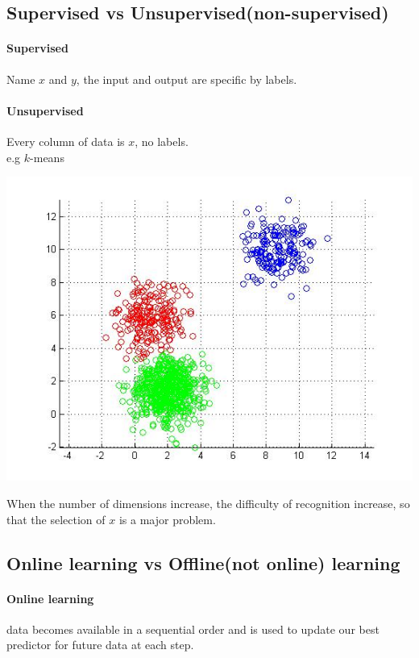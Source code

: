 \documentclass{article}
\begin{document}
{{    \subsection{Supervised vs Unsupervised(non-supervised)}{
        \paragraph{Supervised}{
            Name $x$ and $y$, the input and output are specific by labels.
        }
        \paragraph{Unsupervised}{
            Every column of data is $x$, no labels.\\
            e.g $k$-means
            \begin{center}{
                \includegraphics[scale=0.5]{k-means.jpg}
            }
            \end{center}
            When the number of dimensions increase, the difficulty of recognition increase, so that the selection of $x$ is a major problem.
        }
    }
    \subsection{Online learning vs Offline(not online) learning}{
        \paragraph{Online learning}{
            data becomes available in a sequential order and is used to update our best predictor for future data at each step.
        }
}}}
\end{document}
